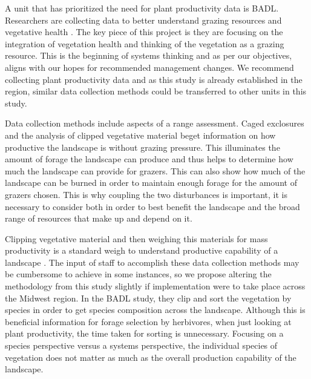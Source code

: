 A unit that has prioritized the need for plant productivity data is BADL. 
Researchers are collecting data to better understand grazing resources and vegetative health \citep{symstad2016}. 
The key piece of this project is they are focusing on the integration of vegetation health and thinking of the vegetation as a grazing resource.
This is the beginning of systems thinking and as per our objectives, aligns with our hopes for recommended management changes. 
We recommend collecting plant productivity data and as this study is already established in the region, similar data collection methods could be transferred to other units in this study.

Data collection methods include aspects of a range assessment. 
Caged exclosures and the analysis of clipped vegetative material beget information on how productive the landscape is without grazing pressure.
This illuminates the amount of forage the landscape can produce and thus helps to determine how much the landscape can provide for grazers. 
This can also show how much of the landscape can be burned in order to maintain enough forage for the amount of grazers chosen. 
This is why coupling the two disturbances is important, it is necessary to consider both in order to best benefit the landscape and the broad range of resources that make up and depend on it.

Clipping vegetative material and then weighing this materials for mass productivity is a standard weigh to understand productive capability of a landscape \citep{mcnaughton1996}. 
The input of staff to accomplish these data collection methods may be cumbersome to achieve in some instances, so we propose altering the methodology from this study slightly if implementation were to take place across the Midwest region.
In the BADL study, they clip and sort the vegetation by species in order to get species composition across the landscape. 
Although this is beneficial information for forage selection by herbivores, when just looking at plant productivity, the time taken for sorting is unnecessary. 
Focusing on a species perspective versus a systems perspective, the individual species of vegetation does not matter as much as the overall production capability of the landscape.